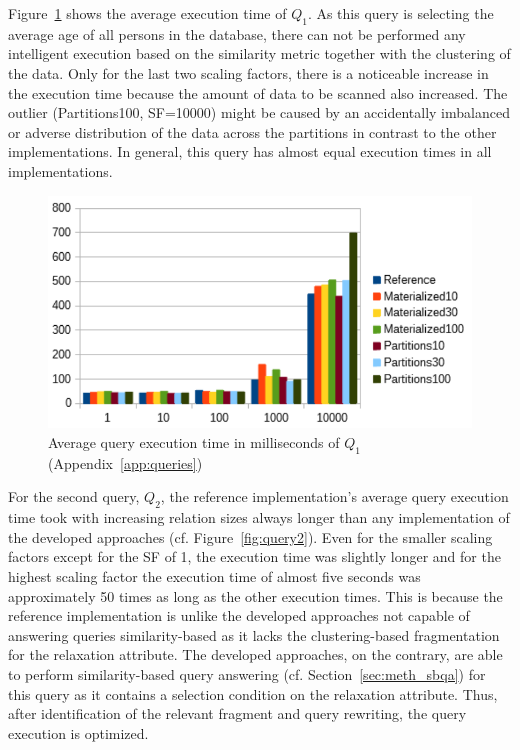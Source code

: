 Figure~\ref{fig:query1} shows the average execution time of $Q_1$. As this query is selecting the average age of all persons in the database, 
there can not be performed any intelligent execution based on the similarity metric together with the clustering of the data. Only for the last two scaling
factors, there is a noticeable increase in the execution time because the amount of data to be scanned also increased. The outlier (Partitions100, SF=10000)
might be caused by an accidentally imbalanced or adverse distribution of the data across the partitions in contrast to the other implementations. In general,
this query has almost equal execution times in all implementations.
\begin{figure}[h]
    \centering
    \includegraphics[scale=0.8]{charts/Query1.pdf}
    \caption{Average query execution time in milliseconds of $Q_1$ (Appendix~\ref{app:queries})}
    \label{fig:query1}
\end{figure}

For the second query, $Q_2$, the reference implementation's average query execution time took with increasing relation sizes always longer than any
implementation of the developed approaches (cf. Figure~\ref{fig:query2}). Even for the smaller scaling factors except for the SF of 1, the execution time was
slightly longer and for the highest scaling factor the execution time of almost five seconds was approximately 50 times as long as the other execution times.
This is because the reference implementation is unlike the developed approaches not capable of answering queries similarity-based as it lacks the
clustering-based fragmentation for the relaxation attribute. The developed approaches, on the contrary, are able to perform similarity-based query answering 
(cf. Section~\ref{sec:meth_sbqa}) for this query as it contains a selection condition on the relaxation attribute. Thus, after identification of the relevant
fragment and query rewriting, the query execution is optimized.

